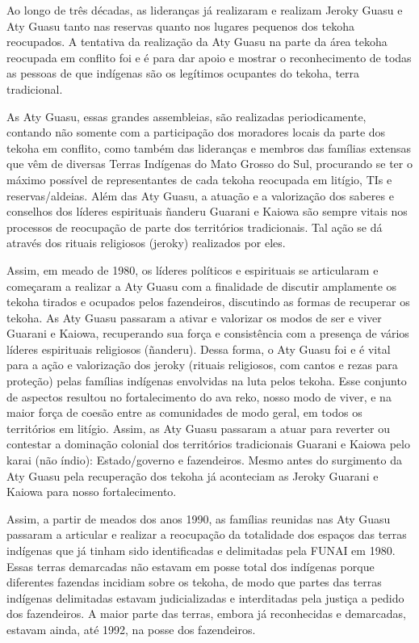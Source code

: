 Ao longo de três décadas, as lideranças já realizaram e realizam Jeroky
Guasu e Aty Guasu tanto nas reservas quanto nos lugares pequenos dos
tekoha reocupados. A tentativa da realização da Aty Guasu na parte da
área tekoha reocupada em conflito foi e é para dar apoio e mostrar o
reconhecimento de todas as pessoas de que indígenas são os legítimos
ocupantes do tekoha, terra tradicional. 

As Aty Guasu, essas grandes assembleias, são realizadas periodicamente,
contando não somente com a participação dos moradores locais da parte
dos tekoha em conflito, como também das lideranças e membros das
famílias extensas que vêm de diversas Terras Indígenas do Mato Grosso
do Sul, procurando se ter o máximo possível de representantes de cada
tekoha reocupada em litígio,  TIs e reservas/aldeias. Além das Aty
Guasu, a atuação e a valorização dos saberes e conselhos dos líderes
espirituais ñanderu Guarani e Kaiowa são sempre vitais nos processos de
reocupação de parte dos territórios tradicionais. Tal ação se dá
através dos rituais religiosos (jeroky) realizados por eles.

Assim, em meado de 1980, os líderes políticos e espirituais se
articularam e começaram a realizar a Aty Guasu com a finalidade de
discutir amplamente os tekoha tirados e ocupados pelos fazendeiros,
discutindo as formas de recuperar os tekoha. As Aty Guasu passaram a
ativar e valorizar os modos de ser e viver Guarani e Kaiowa,
recuperando sua força e consistência com a presença de vários líderes
espirituais religiosos (ñanderu). Dessa forma, o Aty Guasu foi e é
vital para a ação e valorização dos jeroky (rituais religiosos, com
cantos e rezas para proteção) pelas famílias indígenas  envolvidas na
luta pelos tekoha. Esse conjunto de aspectos resultou no fortalecimento
do ava reko, nosso modo de viver, e na maior força de coesão entre as
comunidades de modo geral, em todos os territórios em litígio. Assim,
as Aty Guasu passaram a atuar para reverter ou contestar a dominação
colonial dos territórios tradicionais Guarani e Kaiowa pelo karai (não
índio): Estado/governo e fazendeiros. Mesmo antes do surgimento da Aty
Guasu pela recuperação dos tekoha já aconteciam as Jeroky Guarani e
Kaiowa para nosso fortalecimento.

Assim, a partir de meados dos anos 1990, as famílias reunidas nas Aty
Guasu passaram a articular e realizar a reocupação da totalidade dos
espaços das terras indígenas que já tinham sido identificadas e
delimitadas pela FUNAI em 1980. Essas terras demarcadas não estavam em
posse total dos indígenas porque diferentes fazendas incidiam sobre os
tekoha, de modo que partes das terras indígenas delimitadas estavam
judicializadas e interditadas pela justiça a pedido dos fazendeiros. A
maior parte das terras, embora já reconhecidas e demarcadas, estavam
ainda, até 1992, na posse dos fazendeiros. 

